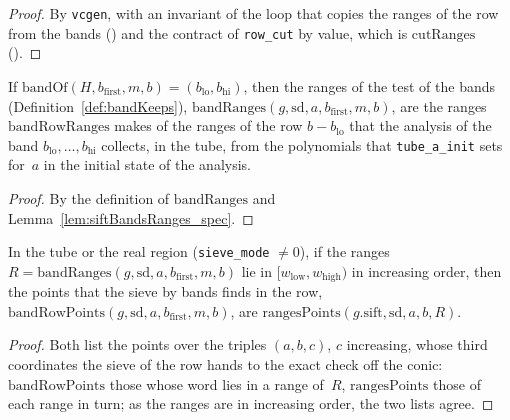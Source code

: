 \begin{proof}
  \leanok
  By \texttt{vcgen}, with an invariant of the loop that copies the ranges of the row from the bands
  () and the contract of \texttt{row\_cut} by value, which is
  $\mathrm{cutRanges}$ ().
\end{proof}

\begin{lemma}\label{lem:bandRanges_eq_bandRowRanges}
  \leanok
  If $\mathrm{bandOf}(H, b_{\mathrm{first}}, m, b) = (b_{\mathrm{lo}}, b_{\mathrm{hi}})$, then the
  ranges of the test of the bands (Definition~\ref{def:bandKeeps}),
  $\mathrm{bandRanges}(g, \mathrm{sd}, a, b_{\mathrm{first}}, m, b)$, are the ranges
  $\mathrm{bandRowRanges}$ makes of the ranges of the row
  $b - b_{\mathrm{lo}}$ that the analysis of the band $b_{\mathrm{lo}}, \dots, b_{\mathrm{hi}}$
  collects, in the tube, from the polynomials that \texttt{tube\_a\_init} sets for~$a$ in the
  initial state of the analysis.
\end{lemma}

\begin{proof}
  \leanok
  By the definition of $\mathrm{bandRanges}$ and Lemma~\ref{lem:siftBandsRanges_spec}.
\end{proof}

\begin{lemma}\label{lem:bandRowPoints_eq_rangesPoints}
  \leanok
  In the tube or the real region (\texttt{sieve\_mode} $\ne 0$), if the ranges $R =
  \mathrm{bandRanges}(g, \mathrm{sd}, a, b_{\mathrm{first}}, m, b)$ lie in $[w_{\mathrm{low}},
  w_{\mathrm{high}})$ in increasing order, then the points that the sieve by bands finds in the row,
  $\mathrm{bandRowPoints}(g, \mathrm{sd}, a, b_{\mathrm{first}}, m, b)$, are
  $\mathrm{rangesPoints}(g.\mathrm{sift}, \mathrm{sd}, a, b, R)$.
\end{lemma}

\begin{proof}
  \leanok
  Both list the points over the triples $(a, b, c)$, $c$ increasing, whose third coordinates the
  sieve of the row hands to the exact check off the conic: $\mathrm{bandRowPoints}$ those whose word
  lies in a range of~$R$, $\mathrm{rangesPoints}$ those of each range in turn; as the ranges are in
  increasing order, the two lists agree.
\end{proof}

